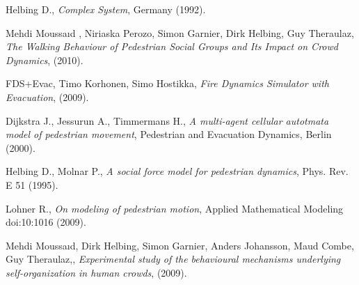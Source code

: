 \begin{thebibliography}{1}

Helbing D., \textsl{Complex System}, Germany (1992).

Mehdi Moussaıd , Niriaska Perozo, Simon Garnier, Dirk
Helbing, Guy Theraulaz,  \textsl{The Walking Behaviour of Pedestrian Social Groups and Its Impact on Crowd Dynamics}, (2010).

FDS+Evac, Timo Korhonen,
Simo Hostikka, \textsl{Fire Dynamics Simulator with Evacuation}, (2009).

Dijkstra J., Jessurun A., Timmermans H., \textsl{A multi-agent cellular autotmata model of pedestrian movement}, Pedestrian and Evacuation Dynamics, Berlin (2000).

Helbing D., Molnar P., \textsl{A social force model for pedestrian dynamics}, Phys. Rev. E 51 (1995).

Lohner R., \textsl{On modeling of pedestrian motion}, Applied Mathematical Modeling doi:10:1016 (2009).

 Mehdi Moussaıd, Dirk Helbing, Simon Garnier, Anders Johansson,
Maud Combe, Guy Theraulaz,, \textsl{Experimental study of the behavioural mechanisms underlying self-organization
in human crowds}, (2009).

\end{thebibliography}
